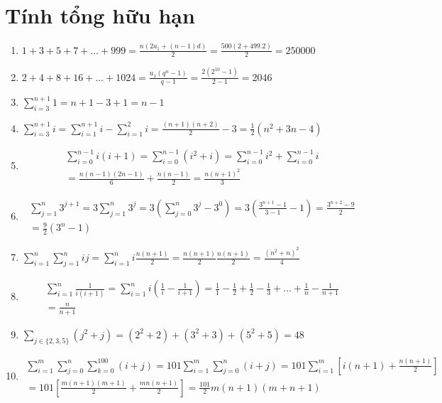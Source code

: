 \documentclass[12pt, a4paper]{article}
\begin{document}
\newpage
{} %

\section{Tính tổng hữu hạn}
\begin{enumerate}[label=\alph*)]
    \item $\displaystyle 1+3+5+7+\ldots+999=\frac{n(2a_1+(n-1)d)}{2}=\frac{500\left(2+499.2\right)}{2}=250000$
    \item $\displaystyle 2+4+8+16+\ldots+1024=\frac{u_{1}(q^{n}-1)}{q-1}=\frac{2(2^{10}-1)}{2-1}=2046$
    \item $\displaystyle \sum_{i=3}^{n+1}1=n+1-3+1=n-1$
    \item $\displaystyle \sum_{i=3}^{n+1}i=\sum_{i=1}^{n+1}i-\sum_{i=1}^{2}i=\frac{(n+1)(n+2)}{2}-3=\frac{1}{2}\left(n^{2}+3n-4\right)
    $
    \item 
    \begin{multline*}
    \displaystyle \sum_{i=0}^{n-1}i(i+1)=\sum_{i=0}^{n-1}(i^{2}+i)=\sum_{i=0}^{n-1}i^{2}+\sum_{i=0}^{n-1}i\\=\frac{n(n-1)(2n-1)}{6}+\frac{n(n-1)}{2}=\frac{n(n+1)^{2}}{3}
    \end{multline*}
    \item
    \begin{multline*}
    \displaystyle\sum_{j=1}^{n}3^{j+1}=3\sum_{j=1}^{n}3^{j}=3\left(\sum_{j=0}^{n}3^{j}-3^{0}\right)=3\left(\frac{3^{n+1}-1}{3-1}-1\right)=\frac{3^{n+2}-9}{2}\\=\frac{9}{2}(3^{n}-1)
    \end{multline*}
    \item $\displaystyle
    \sum_{i=1}^{n}\sum_{j=1}^{n}ij=\sum_{i=1}^{n}i\frac{n(n+1)}{2}=\frac{n(n+1)}{2}\frac{n(n+1)}{2}=\frac{(n^{2}+n)^{2}}{4}
    $
    \item 
    \begin{multline*}
    \displaystyle
    \sum_{i=1}^{n}\frac{1}{i(i+1)}=\sum_{i=1}^{n}i\left(\frac{1}{i}-\frac{1}{i+1}\right)=\frac{1}{1}-\frac{1}{2}+\frac{1}{2}-\frac{1}{3}+\ldots+\frac{1}{n}-\frac{1}{n+1} \\=\frac{n}{n+1}
    \end{multline*}
    \item
    $\displaystyle\sum_{j\in\{2,3,5\}}(j^{2}+j)=(2^{2}+2)+(3^{2}+3)+(5^{2} +5)=48
    $
    \item
    \begin{multline*}
    \displaystyle
    \sum_{i=1}^{m}\sum_{j=0}^{n}\sum_{k=0}^{100}(i+j)=101\sum_{i=1}^{m}\sum_{j=0}^{n}(i+j)=101\sum_{i=1}^{m}\left[i(n+1)+\frac{n(n+1)}{2}\right]\\=101\left[\frac{m(n+1)(m+1)}{2}+\frac{mn(n+1)}{2}\right]=\frac{101}{2}m(n+1)(m+n+1)
    \end{multline*}
\end{enumerate}
\end{document}
